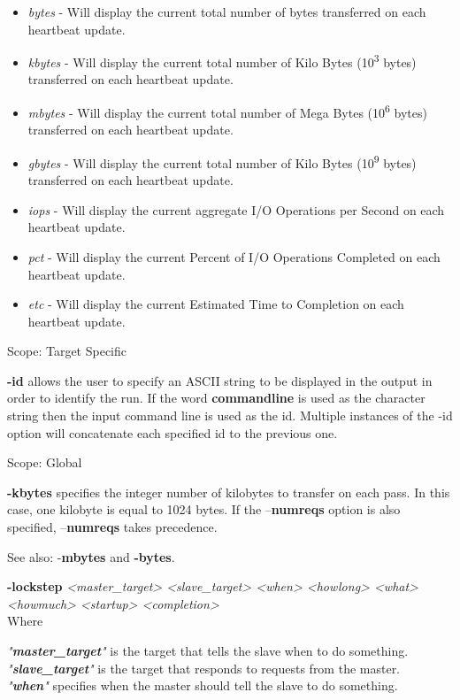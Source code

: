 \begin{itemize}
\item
  \emph{bytes} - Will display the current total number of bytes transferred on each heartbeat update.
\item
  \emph{kbytes} - Will display the current total number of Kilo Bytes (10\textsuperscript{3} bytes) transferred on each heartbeat update.
\item
  \emph{mbytes} - Will display the current total number of Mega Bytes (10\textsuperscript{6} bytes) transferred on each heartbeat update.
\item
  \emph{gbytes} - Will display the current total number of Kilo Bytes (10\textsuperscript{9} bytes) transferred on each heartbeat update.
\item
  \emph{iops} - Will display the current aggregate I/O Operations per Second on each heartbeat update.
\item
  \emph{pct} - Will display the current Percent of I/O Operations Completed on each heartbeat update.
\item
  \emph{etc} - Will display the current Estimated Time to Completion on each heartbeat update.
\end{itemize}

Scope: Target Specific

\textbf{-id} allows the user to specify an ASCII string to be displayed in the output in order to identify the run. If the word \textbf{commandline} is used as the character string then the input command line is used as the id. Multiple instances of the -id option will concatenate each specified id to the previous one.

Scope: Global

\textbf{-kbytes} specifies the integer number of kilobytes to transfer on each pass. In this case, one kilobyte is equal to 1024 bytes. If the --\textbf{numreqs} option is also specified, --\textbf{numreqs} takes precedence.

See also: -\textbf{mbytes} and \textbf{-bytes}.

\textbf{-lockstep} \emph{\textless master\_target\textgreater{} \textless slave\_target\textgreater{} \textless when\textgreater{} \textless howlong\textgreater{} \textless what\textgreater{} \textless howmuch\textgreater{} \textless startup\textgreater{} \textless completion\textgreater{}\\
}Where

\emph{"\textbf{master\_target}"} is the target that tells the slave when to do something.\emph{\hfill\break
~~~~~~ "\textbf{slave\_target}"} is the target that responds to requests from the master.\emph{\hfill\break
~~~~~~ "\textbf{when}"} specifies when the master should tell the slave to do something.

